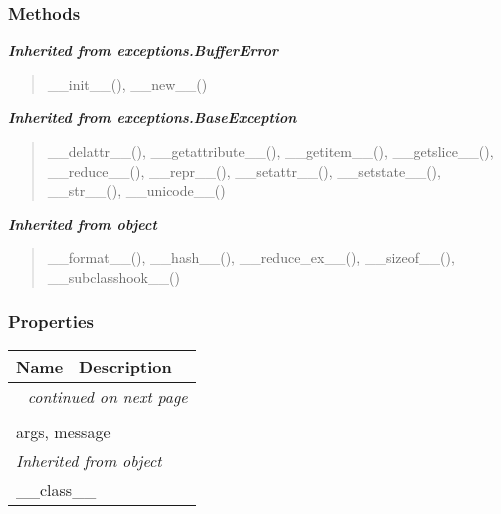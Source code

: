   \subsubsection{Methods}


\large{\textbf{\textit{Inherited from exceptions.BufferError}}}

\begin{quote}
\_\_init\_\_(), \_\_new\_\_()
\end{quote}

\large{\textbf{\textit{Inherited from exceptions.BaseException}}}

\begin{quote}
\_\_delattr\_\_(), \_\_getattribute\_\_(), \_\_getitem\_\_(), \_\_getslice\_\_(), \_\_reduce\_\_(), \_\_repr\_\_(), \_\_setattr\_\_(), \_\_setstate\_\_(), \_\_str\_\_(), \_\_unicode\_\_()
\end{quote}

\large{\textbf{\textit{Inherited from object}}}

\begin{quote}
\_\_format\_\_(), \_\_hash\_\_(), \_\_reduce\_ex\_\_(), \_\_sizeof\_\_(), \_\_subclasshook\_\_()
\end{quote}


  \subsubsection{Properties}

    \vspace{-1cm}
\hspace{\varindent}\begin{longtable}{|p{\varnamewidth}|p{\vardescrwidth}|l}
\cline{1-2}
\cline{1-2} \centering \textbf{Name} & \centering \textbf{Description}& \\
\cline{1-2}
\endhead\cline{1-2}\multicolumn{3}{r}{\small\textit{continued on next page}}\\\endfoot\cline{1-2}
\endlastfoot\multicolumn{2}{|l|}{\textit{Inherited from exceptions.BaseException}}\\
\multicolumn{2}{|p{\varwidth}|}{\raggedright args, message}\\
\cline{1-2}
\multicolumn{2}{|l|}{\textit{Inherited from object}}\\
\multicolumn{2}{|p{\varwidth}|}{\raggedright \_\_class\_\_}\\
\cline{1-2}
\end{longtable}

